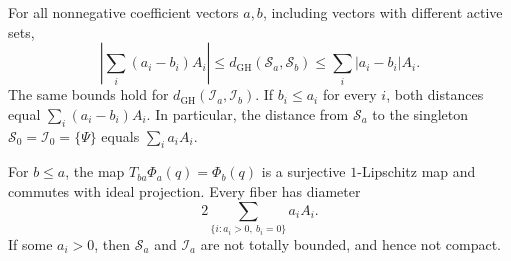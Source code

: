 \begin{proposition}\label{prop:weighted-product-metric-comparison}
For all nonnegative coefficient vectors $a,b$, including vectors with different active sets,
\begin{equation}\label{eq:weighted-product-gh-bounds}
 \left|\sum_i(a_i-b_i)A_i\right|
 \leq d_{\mathrm{GH}}(\mathcal S_a,\mathcal S_b)
 \leq\sum_i|a_i-b_i|A_i.
\end{equation}
The same bounds hold for $d_{\mathrm{GH}}(\mathcal I_a,\mathcal I_b)$. If $b_i\leq a_i$ for every $i$, both distances equal $\sum_i(a_i-b_i)A_i$. In particular, the distance from $\mathcal S_a$ to the singleton $\mathcal S_0=\mathcal I_0=\{\Psi\}$ equals $\sum_i a_iA_i$.

For $b\leq a$, the map $T_{ba}\Phi_a(q)=\Phi_b(q)$ is a surjective $1$-Lipschitz map and commutes with ideal projection. Every fiber has diameter
\[
 2\sum_{\{i:a_i>0,\ b_i=0\}}a_iA_i.
\]
If some $a_i>0$, then $\mathcal S_a$ and $\mathcal I_a$ are not totally bounded, and hence not compact.
\end{proposition}
